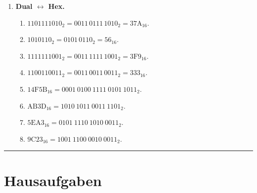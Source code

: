 \documentclass[11pt,a4paper]{scrartcl}
\begin{document}
\begin{enumerate}[leftmargin=*,label=\textbf{Aufgabe~\arabic*:}, itemsep=0.9em]
		\item \textbf{Dual \(\leftrightarrow\) Hex.}
		\begin{enumerate}[label*=\alph*)]
			\item \(1101111010_2 = 0011\,0111\,1010_2 = \boxed{\mathrm{37A}_{16}}\).
			\item \(1010110_2 = 0101\,0110_2 = \boxed{\mathrm{56}_{16}}\).
			\item \(1111111001_2 = 0011\,1111\,1001_2 = \boxed{\mathrm{3F9}_{16}}\).
			\item \(1100110011_2 = 0011\,0011\,0011_2 = \boxed{\mathrm{333}_{16}}\).
			\item \(\mathrm{14F5B}_{16} = \boxed{0001\ 0100\ 1111\ 0101\ 1011_2}\).
			\item \(\mathrm{AB3D}_{16} = \boxed{1010\ 1011\ 0011\ 1101_2}\).
			\item \(\mathrm{5EA3}_{16} = \boxed{0101\ 1110\ 1010\ 0011_2}\).
			\item \(\mathrm{9C23}_{16} = \boxed{1001\ 1100\ 0010\ 0011_2}\).
		\end{enumerate}
		
	\end{enumerate}
	
	\hrule
	\vspace{0.6em}
	
	\section*{Hausaufgaben}
	
\end{document}
